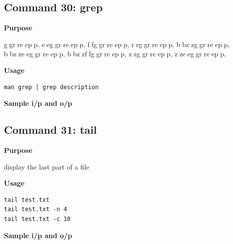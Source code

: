 \documentclass{article}
\begin{document}
\subsection{Command 30: grep} 
\textbf{Purpose}
\begin{flushleft}
     ggrreepp, eeggrreepp, ffggrreepp, rrggrreepp, bbzzggrreepp, bbzzeeggrreepp, bbzzffggrreepp, zzggrreepp, zzeeggrreepp,
\end{flushleft}
\textbf{Usage}
\begin{verbatim}
man grep | grep description
\end{verbatim}
\textbf{Sample i/p and o/p}
\begin{figure}[H] 
\end{figure}
\subsection{Command 31: tail} 
\textbf{Purpose}
\begin{flushleft}
 display the last part of a file
\end{flushleft}
\textbf{Usage}
\begin{verbatim}
tail test.txt
tail test.txt -n 4
tail test.txt -c 10
\end{verbatim}
\textbf{Sample i/p and o/p}
\begin{figure}[H] 
\end{figure}
\end{document}
